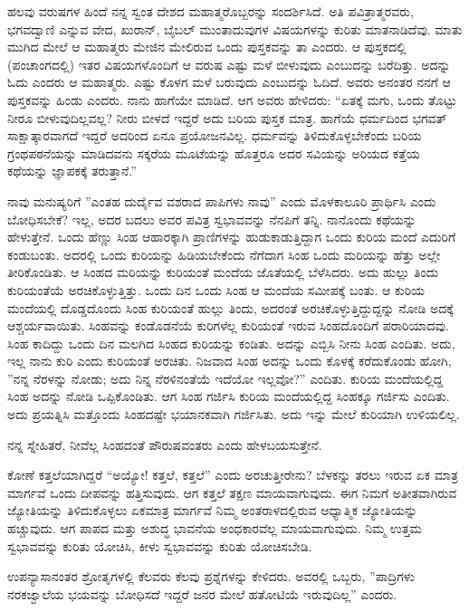 ಹಲವು ವರುಷಗಳ ಹಿಂದೆ ನನ್ನ ಸ್ವಂತ ದೇಶದ ಮಹಾತ್ಮರೊಬ್ಬರನ್ನು ಸಂದರ್ಶಿಸಿದೆ. ಅತಿ ಪವಿತ್ರಾತ್ಮರವರು, ಭಗವದ್ವಾಣಿ ಎನ್ನುವ ವೇದ, ಖುರಾನ್, ಬೈಬಲ್ ಮುಂತಾದುವುಗಳ ವಿಷಯಗಳನ್ನು ಕುರಿತು ಮಾತನಾಡಿದೆವು. ಮಾತು ಮುಗಿದ ಮೇಲೆ ಆ ಮಹಾತ್ಮರು ಮೇಜಿನ ಮೇಲಿರುವ ಒಂದು ಪುಸ್ತಕವನ್ನು ತಾ ಎಂದರು. ಆ ಪುಸ್ತಕದಲ್ಲಿ (ಪಂಚಾಂಗದಲ್ಲಿ) ಇತರ ವಿಷಯಗಳೊಂದಿಗೆ ಆ ವರುಷ ಎಷ್ಟು ಮಳೆ ಬೀಳುವುದು ಎಂಬುದನ್ನು ಬರೆದಿತ್ತು. ಅದನ್ನು ಓದು ಎಂದರು ಆ ಮಹಾತ್ಮರು. ಎಷ್ಟು ಕೊಳಗ ಮಳೆ ಬರುವುದು ಎಂಬುದನ್ನು ಓದಿದೆ. ಅವರು ಅನಂತರ ನನಗೆ ಆ ಪುಸ್ತಕವನ್ನು ಹಿಂಡು ಎಂದರು. ನಾನು ಹಾಗೆಯೇ ಮಾಡಿದೆ. ಆಗ ಅವರು ಹೇಳಿದರು: “ಏತಕ್ಕೆ ಮಗು, ಒಂದು ತೊಟ್ಟು ನೀರೂ ಬೀಳುವುದಿಲ್ಲವಲ್ಲ? ನೀರು ಬೀಳದೆ ಇದ್ದರೆ ಅದು ಬರಿಯ ಪುಸ್ತಕ ಮಾತ್ರ. ಹಾಗೆಯೆ ಧರ್ಮದಿಂದ ಭಗವತ್ ಸಾಕ್ಷಾತ್ಕಾರವಾಗದೆ ಇದ್ದರೆ ಅದರಿಂದ ಏನೂ ಪ್ರಯೋಜನವಿಲ್ಲ. ಧರ್ಮವನ್ನು ತಿಳಿದುಕೊಳ್ಳಬೇಕೆಂದು ಬರಿಯ ಗ್ರಂಥಪಠನೆಯನ್ನು ಮಾಡಿದವನು ಸಕ್ಕರೆಯ ಮೂಟೆಯನ್ನು ಹೊತ್ತರೂ ಅದರ ಸವಿಯನ್ನು ಅರಿಯದ ಕತ್ತೆಯ ಕಥೆಯನ್ನು ಜ್ಞಾಪಕಕ್ಕೆ ತರುತ್ತಾನೆ.”

ನಾವು ಮನುಷ್ಯರಿಗೆ ''ಎಂತಹ ದುರ್ದೈವ ವಶರಾದ ಪಾಪಿಗಳು ನಾವು'' ಎಂದು ಮೊಳಕಾಲೂರಿ ಪ್ರಾರ್ಥಿಸಿ ಎಂದು ಬೋಧಿಸಬೇಕೆ? ಇಲ್ಲ, ಅದರ ಬದಲು ಅವರ ಪವಿತ್ರ ಸ್ವಭಾವವನ್ನು ನೆನಪಿಗೆ ತನ್ನಿ. ನಾನೊಂದು ಕಥೆಯನ್ನು ಹೇಳುತ್ತೇನೆ. ಒಂದು ಹೆಣ್ಣು ಸಿಂಹ ಆಹಾರಕ್ಕಾಗಿ ಪ್ರಾಣಿಗಳನ್ನು ಹುಡುಕಾಡುತ್ತಿದ್ದಾಗ ಒಂದು ಕುರಿಯ ಮಂದೆ ಎದುರಿಗೆ ಕಂಡುಬಂತು. ಅದರಲ್ಲಿ ಒಂದು ಕುರಿಯನ್ನು ಹಿಡಿಯಬೇಕೆಂದು ನೆಗೆದಾಗ ಸಿಂಹ ಒಂದು ಮರಿಯನ್ನು ಹೆತ್ತು ಅಲ್ಲೇ ತೀರಿಕೊಂಡಿತು. ಆ ಸಿಂಹದ ಮರಿಯನ್ನು ಕುರಿಯಂತೆ ಮಂದೆಯ ಜೊತೆಯಲ್ಲಿ ಬೆಳೆಸಿದರು. ಅದು ಹುಲ್ಲು ತಿಂದು ಕುರಿಯಂತೆಯೆ ಅರಚಿಕೊಳ್ಳುತ್ತಿತ್ತು. ಒಂದು ದಿನ ಒಂದು ಸಿಂಹ ಆ ಮಂದೆಯ ಸಮೀಪಕ್ಕೆ ಬಂತು. ಆ ಕುರಿಯ ಮಂದೆಯಲ್ಲಿ ದೊಡ್ಡದೊಂದು ಸಿಂಹ ಕುರಿಯಂತೆ ಹುಲ್ಲು ತಿಂದು, ಅದರಂತೆ ಅರಚಿಕೊಳ್ಳುತ್ತಿದ್ದುದ್ದನ್ನು ನೋಡಿ ಅದಕ್ಕೆ ಆಶ್ಚರ್ಯವಾಯಿತು. ಸಿಂಹವನ್ನು ಕಂಡೊಡನೆಯೆ ಕುರಿಗಳೆಲ್ಲ ಕುರಿಯಂತೆ ಇರುವ ಸಿಂಹದೊಂದಿಗೆ ಪರಾರಿಯಾದವು. ಸಿಂಹ ಕಾದಿದ್ದು ಒಂದು ದಿನ ಮಲಗಿದ ಸಿಂಹದ ಕುರಿಯನ್ನು ಕಂಡಿತು. ಅದನ್ನು ಎಬ್ಬಿಸಿ ನೀನು ಸಿಂಹ ಎಂದಿತು. ಅದು, ಇಲ್ಲ ನಾನು ಕುರಿ ಎಂದು ಕುರಿಯಂತೆ ಅರಚಿತು. ನಿಜವಾದ ಸಿಂಹ ಅದನ್ನು ಒಂದು ಕೊಳಕ್ಕೆ ಕರೆದುಕೊಂಡು ಹೋಗಿ, ''ನನ್ನ ನೆರಳನ್ನು ನೋಡು; ಅದು ನಿನ್ನ ನೆರಳಿನಂತೆಯೆ ಇದೆಯೋ ಇಲ್ಲವೋ?'' ಎಂದಿತು. ಕುರಿಯ ಮಂದೆಯಲ್ಲಿದ್ದ ಸಿಂಹ ಅದನ್ನು ನೋಡಿ ಒಪ್ಪಿಕೊಂಡಿತು. ಆಗ ಸಿಂಹ ಗರ್ಜಿಸಿ ಕುರಿಯ ಮಂದೆಯಲ್ಲಿದ್ದ ಸಿಂಹಕ್ಕೂ ಗರ್ಜಿಸು ಎಂದಿತು. ಅದು ಪ್ರಯತ್ನಿಸಿ ಮತ್ತೊಂದು ಸಿಂಹದಷ್ಟೇ ಭಯಾನಕವಾಗಿ ಗರ್ಜಿಸಿತು. ಅದು ಇನ್ನು ಮೇಲೆ ಕುರಿಯಾಗಿ ಉಳಿಯಲಿಲ್ಲ.

ನನ್ನ ಸ್ನೇಹಿತರೆ, ನೀವೆಲ್ಲ ಸಿಂಹದಂತೆ ಪೌರುಷವಂತರು ಎಂದು ಹೇಳಬಯಸುತ್ತೇನೆ.

ಕೋಣೆ ಕತ್ತಲೆಯಾಗಿದ್ದರೆ “ಅಯ್ಯೋ! ಕತ್ತಲೆ, ಕತ್ತಲೆ'' ಎಂದು ಅರಚುತ್ತೀರೇನು? ಬೆಳಕನ್ನು ತರಲು ಇರುವ ಏಕ ಮಾತ್ರ ಮಾರ್ಗವೆ ಒಂದು ದೀಪವನ್ನು ಹತ್ತಿಸುವುದು. ಆಗ ಕತ್ತಲೆ ತಕ್ಷಣ ಮಾಯವಾಗುವುದು. ಈಗ ನಿಮಗೆ ಅತೀತವಾಗಿರುವ ಜ್ಯೋತಿಯನ್ನು ತಿಳಿದುಕೊಳ್ಳಲು ಏಕಮಾತ್ರ ಮಾರ್ಗವೆ ನಿಮ್ಮ ಅಂತರಾಳದಲ್ಲಿರುವ ಆಧ್ಯಾತ್ಮಿಕ ಜ್ಯೋತಿಯನ್ನು ಹಚ್ಚುವುದು. ಆಗ ಪಾಪದ ಮತ್ತು ಅಶುದ್ಧ ಭಾವನೆಯ ಅಂಧಕಾರವೆಲ್ಲ ಮಾಯವಾಗುವುದು. ನಿಮ್ಮ ಉತ್ತಮ ಸ್ವಭಾವವನ್ನು ಕುರಿತು ಯೋಚಿಸಿ, ಕೀಳು ಸ್ವಭಾವವನ್ನು ಕುರಿತು ಯೋಚಿಸಬೇಡಿ.

\delimiter

ಉಪನ್ಯಾಸಾನಂತರ ಶ್ರೋತೃಗಳಲ್ಲಿ ಕೆಲವರು ಕೆಲವು ಪ್ರಶ್ನೆಗಳನ್ನು ಕೇಳಿದರು. ಅವರಲ್ಲಿ ಒಬ್ಬರು, ''ಪಾದ್ರಿಗಳು ನರಕಜ್ವಾಲೆಯ ಭಯವನ್ನು ಬೋಧಿಸದೆ ಇದ್ದರೆ ಜನರ ಮೇಲೆ ಹತೋಟಿಯೆ ಇರುವುದಿಲ್ಲ” ಎಂದರು.

